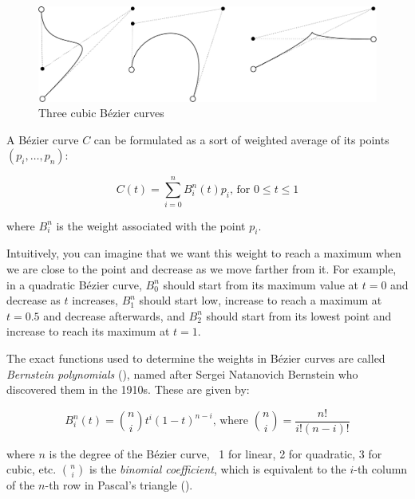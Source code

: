 \begin{figure}
\centering
\includegraphics[width=\linewidth]{figs/cubic}
\caption{Three cubic B\'ezier curves}%
\label{fig:cubic}
\end{figure}

A B\'ezier curve \(C\) can be formulated as a sort of weighted average of its points \((p_i, \ldots, p_n)\):

\begin{equation}
\label{eq:beziercurve}
C(t) = \sum_{i=0}^n B^n_i(t) p_i\text{, for }0 \leq t \leq 1
\end{equation}

where \(B^n_i\) is the weight associated with the point \(p_i\).

Intuitively, you can imagine that we want this weight to reach a maximum when we are close to the point and decrease as we move farther from it.
For example, in a quadratic B\'ezier curve, \(B^n_0\) should start from its maximum value at \(t=0\) and decrease as \(t\) increases, \(B^n_1\) should start low, increase to reach a maximum at \(t=0.5\) and decrease afterwards, and \(B^n_2\) should start from its lowest point and increase to reach its maximum at \(t=1\).

The exact functions used to determine the weights in B\'ezier curves are called \emph{Bernstein polynomials} (), named after Sergei Natanovich Bernstein who discovered them in the 1910s.
These are given by:

\begin{equation}
\label{eq:bernstein}
B^n_i(t) = \binom{n}{i} t^i (1-t)^{n-i}\text{, where }\binom{n}{i} = \frac{n!}{i! (n-i)!}
\end{equation}

where \(n\) is the degree of the B\'ezier curve, \ie\ 1 for linear, 2 for quadratic, 3 for cubic, etc.
\(\binom{n}{i}\) is the \emph{binomial coefficient}, which is equivalent to the \(i\)-th column of the \(n\)-th row in Pascal's triangle ().

